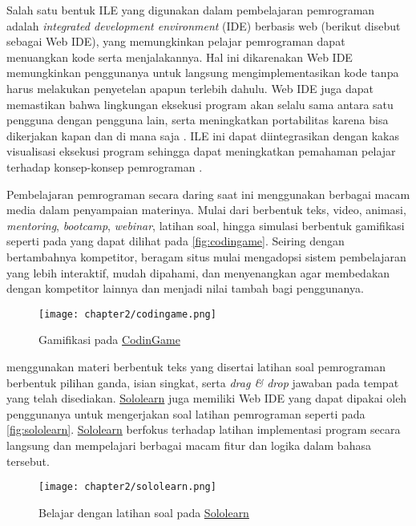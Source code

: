 Salah satu bentuk ILE yang digunakan dalam pembelajaran pemrograman adalah \textit{integrated development environment} (IDE) berbasis web (berikut disebut sebagai Web IDE), yang memungkinkan pelajar pemrograman dapat menuangkan kode serta menjalakannya. Hal ini dikarenakan Web IDE memungkinkan penggunanya untuk langsung mengimplementasikan kode tanpa harus melakukan penyetelan apapun terlebih dahulu. Web IDE juga dapat memastikan bahwa lingkungan eksekusi program akan selalu sama antara satu pengguna dengan pengguna lain, serta meningkatkan portabilitas karena bisa dikerjakan kapan dan di mana saja \parencite{tran2013interactive}. ILE ini dapat diintegrasikan dengan kakas visualisasi eksekusi program sehingga dapat meningkatkan pemahaman pelajar terhadap konsep-konsep pemrograman \parencite{moons2013pilot}.

Pembelajaran pemrograman secara daring saat ini menggunakan berbagai macam media dalam penyampaian materinya. Mulai dari berbentuk teks, video, animasi, \textit{mentoring}, \textit{bootcamp}, \textit{webinar}, latihan soal, hingga simulasi berbentuk gamifikasi seperti pada \textcite{codingame2021media} yang dapat dilihat pada \autoref{fig:codingame}. Seiring dengan bertambahnya kompetitor, beragam situs mulai mengadopsi sistem pembelajaran yang lebih interaktif, mudah dipahami, dan menyenangkan agar membedakan dengan kompetitor lainnya dan menjadi nilai tambah bagi penggunanya.

\begin{figure}[H]
  \centering
  \texttt{[image: chapter2/codingame.png]}
  \caption{\label{fig:codingame}Gamifikasi pada \href{https://www.codingame.com}{CodinGame}}
\end{figure}

\textcite{sololearn2021media} menggunakan materi berbentuk teks yang disertai latihan soal pemrograman berbentuk pilihan ganda, isian singkat, serta \textit{drag \& drop} jawaban pada tempat yang telah disediakan. \href{https://www.sololearn.com}{Sololearn} juga memiliki Web IDE yang dapat dipakai oleh penggunanya untuk mengerjakan soal latihan pemrograman seperti pada \autoref{fig:sololearn}. \href{https://www.sololearn.com}{Sololearn} berfokus terhadap latihan implementasi program secara langsung dan mempelajari berbagai macam fitur dan logika dalam bahasa tersebut.

\begin{figure}[H]
  \centering
  \texttt{[image: chapter2/sololearn.png]}
  \caption{\label{fig:sololearn}Belajar dengan latihan soal pada \href{https://www.sololearn.com}{Sololearn}}
\end{figure}

